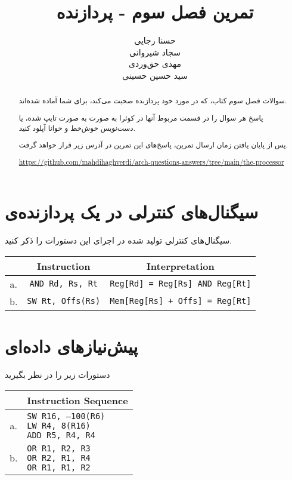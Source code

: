 \documentclass[11pt, dvipsnames, svgnames, x11names]{article}
\title{تمرین فصل سوم - پردازنده}
\author{
حسنا رجایی \\
    سجاد شیروانی \\
    مهدی‌ حق‌وردی \\
سید حسین حسینی}
\date{}
\begin{document}
\maketitle    
\begin{abstract}        
سوالات فصل سوم کتاب، که در مورد خود پردازنده صحبت می‌کند، برای شما آماده شده‌اند.

پاسخ هر سوال را در قسمت مربوط آنها در کوئرا به صورت  به صورت تایپ‌ شده، یا دست‌نویس خوش‌خط و خوانا آپلود کنید.               

پس از پایان‌ یافتن زمان ارسال تمرین، پاسخ‌های این تمرین در آدرس زیر قرار خواهد گرفت.
\begin{flushleft}
\url{https://github.com/mahdihaghverdi/arch-questions-answers/tree/main/the-processor}
\end{flushleft}

\end{abstract}
\tableofcontents
\newpage

\section{سیگنال‌های کنترلی در یک پردازنده‌ی }

سیگنال‌های کنترلی تولید شده در اجرای این دستورات را ذکر کنید.
\begin{latin}
\begin{table}[H]
\begin{center}
\begin{tabular}{|c|c|c|}
\hline
& Instruction & Interpretation \\
\hline
a. &
\texttt{AND Rd, Rs, Rt} &
\texttt{Reg[Rd] = Reg[Rs] AND Reg[Rt]} \\
\hline
b. &
\texttt{SW Rt, Offs(Rs)} &
\texttt{Mem[Reg[Rs] + Offs] = Reg[Rt]} \\
\hline
\end{tabular}
\end{center}
\end{table}
\end{latin}

\section{پیش‌نیاز‌‌های داده‌ای}
دستورات زیر را در نظر بگیرید
\begin{latin}
\begin{table}[H]
\begin{center}
\begin{tabular}{|c|l|}
\hline
& Instruction Sequence \\
\hline
a. &
\makecell[l]{\texttt{SW R16, –100(R6)} \\ \texttt{LW  R4, 8(R16)} \\ \texttt{ADD R5, R4, R4}} \\
\hline
b. &
\makecell[l]{\texttt{OR R1, R2, R3} \\ \texttt{OR R2, R1, R4} \\ \texttt{OR R1, R1, R2}}\\
\hline
\end{tabular}
\end{center}
\end{table}
\end{latin}
\end{document}
